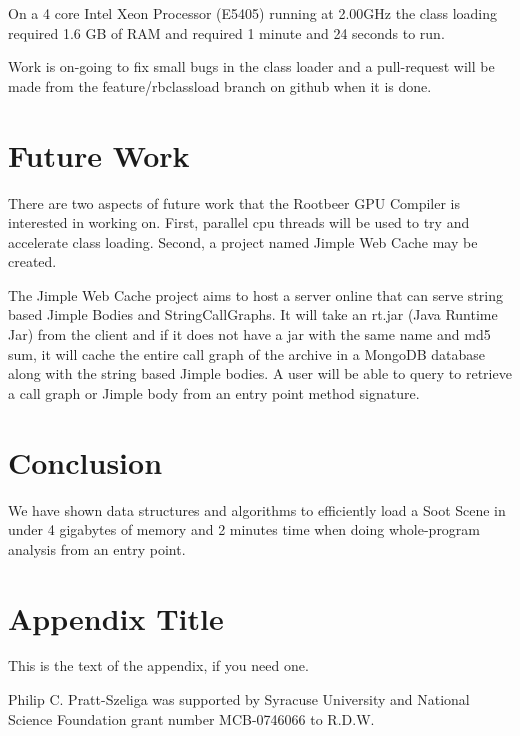 \documentclass[preprint]{sigplanconf}
\begin{document}
On a 4 core Intel Xeon Processor (E5405) running at 2.00GHz the class loading required 1.6 GB of RAM and required 1 minute and 24 seconds to run. 

Work is on-going to fix small bugs in the class loader and a pull-request will be made from the feature/rbclassload branch on github when it is done.

\section{Future Work}
\label{sec:future}
There are two aspects of future work that the Rootbeer GPU Compiler is interested in working on. First, parallel cpu threads will be used to try and accelerate class loading. Second, a project named Jimple Web Cache may be created.

The Jimple Web Cache project aims to host a server online that can serve string based Jimple Bodies and StringCallGraphs. It will take an rt.jar (Java Runtime Jar) from the client and if it does not have a jar with the same name and md5 sum, it will cache the entire call graph of the archive in a MongoDB database along with the string based Jimple bodies. A user will be able to query to retrieve a call graph or Jimple body from an entry point method signature.

\section{Conclusion}
\label{sec:conclusion}
We have shown data structures and algorithms to efficiently load a Soot Scene in under 4 gigabytes of memory and 2 minutes time when doing whole-program analysis from an entry point.

\appendix
\section{Appendix Title}

This is the text of the appendix, if you need one.

\acks
Philip C. Pratt-Szeliga was supported by Syracuse University and National Science Foundation grant number MCB-0746066 to R.D.W.




\end{document}
